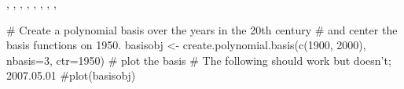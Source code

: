 \begin{SeeAlso}\relax
{},
,
,
,
,
,
,
,
\end{SeeAlso}
\begin{Examples}
\begin{ExampleCode}
#  Create a polynomial basis over the years in the 20th century
#  and center the basis functions on 1950.
basisobj <- create.polynomial.basis(c(1900, 2000), nbasis=3, ctr=1950)
#  plot the basis
# The following should work but doesn't;  2007.05.01
#plot(basisobj)
\end{ExampleCode}
\end{Examples}

